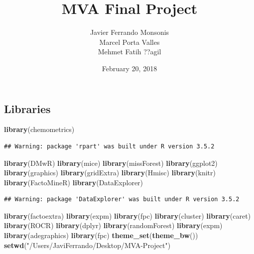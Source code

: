\documentclass[]{article}
\title{MVA Final Project}
\author{Javier Ferrando Monsonis \\ Marcel Porta Valles \\ Mehmet Fatih ??agil}
\date{February 20, 2018}
\newenvironment{Shaded}{\begin{snugshade}}{\end{snugshade}}
\newcommand{\KeywordTok}[1]{\textcolor[rgb]{0.13,0.29,0.53}{\textbf{#1}}}
\newcommand{\StringTok}[1]{\textcolor[rgb]{0.31,0.60,0.02}{#1}}
\newcommand{\NormalTok}[1]{#1}
\begin{document}
\maketitle

\subsection{Libraries}\label{libraries}

\begin{Shaded}
\begin{Highlighting}[]
\KeywordTok{library}\NormalTok{(chemometrics)}
\end{Highlighting}
\end{Shaded}

\begin{verbatim}
## Warning: package 'rpart' was built under R version 3.5.2
\end{verbatim}

\begin{Shaded}
\begin{Highlighting}[]
\KeywordTok{library}\NormalTok{(DMwR)}
\KeywordTok{library}\NormalTok{(mice)}
\KeywordTok{library}\NormalTok{(missForest)}
\KeywordTok{library}\NormalTok{(ggplot2)}
\KeywordTok{library}\NormalTok{(graphics)}
\KeywordTok{library}\NormalTok{(gridExtra)}
\KeywordTok{library}\NormalTok{(Hmisc)}
\KeywordTok{library}\NormalTok{(knitr)}
\KeywordTok{library}\NormalTok{(FactoMineR)}
\KeywordTok{library}\NormalTok{(DataExplorer)}
\end{Highlighting}
\end{Shaded}

\begin{verbatim}
## Warning: package 'DataExplorer' was built under R version 3.5.2
\end{verbatim}

\begin{Shaded}
\begin{Highlighting}[]
\KeywordTok{library}\NormalTok{(factoextra)}
\KeywordTok{library}\NormalTok{(expm)}
\KeywordTok{library}\NormalTok{(fpc)}
\KeywordTok{library}\NormalTok{(cluster)}
\KeywordTok{library}\NormalTok{(caret)}
\KeywordTok{library}\NormalTok{(ROCR)}
\KeywordTok{library}\NormalTok{(dplyr)}
\KeywordTok{library}\NormalTok{(randomForest)}
\KeywordTok{library}\NormalTok{(expm)}
\KeywordTok{library}\NormalTok{(adegraphics)}
\KeywordTok{library}\NormalTok{(fpc)}
\KeywordTok{theme_set}\NormalTok{(}\KeywordTok{theme_bw}\NormalTok{())}
\KeywordTok{setwd}\NormalTok{(}\StringTok{"/Users/JaviFerrando/Desktop/MVA-Project"}\NormalTok{)}
\end{Highlighting}
\end{Shaded}
\end{document}
